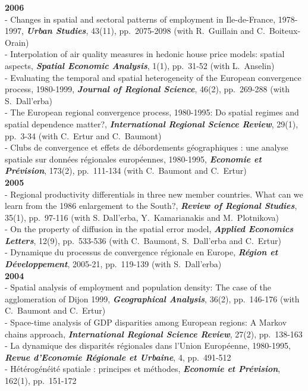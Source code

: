 \documentclass[a4paper,12pt]{article}
\begin{document}
\noindent \textbf{2006}  \smallskip \\ 
- Changes in spatial and sectoral patterns of employment in Ile-de-France, 1978-1997, \textit{\textbf{Urban Studies}}, 43(11), pp.~2075-2098 (with R.~Guillain and C.~Boiteux-Orain) \\
- Interpolation of air quality measures in hedonic house price models: spatial aspects, \textit{\textbf{Spatial Economic Analysis}}, 1(1), pp.~31-52 (with L.~Anselin) \\
- Evaluating the temporal and spatial heterogeneity of the European convergence process, 1980-1999, \textit{\textbf{Journal of Regional Science}}, 46(2), pp.~269-288 (with S.~Dall'erba) \\
- The European regional convergence process, 1980-1995: Do spatial regimes and spatial dependence matter?, \textit{\textbf{International Regional Science Review}}, 29(1), pp.~3-34 (with C.~Ertur and C.~Baumont) \\
- Clubs de convergence et effets de débordements géographiques : une analyse spatiale sur données régionales européennes, 1980-1995, \textit{\textbf{Economie et Prévision}}, 173(2), pp.~111-134 (with C.~Baumont and C.~Ertur) \\

\noindent \textbf{2005}  \smallskip \\ 
- Regional productivity differentials in three new member countries. What can we learn from the 1986 enlargement to the South?, \textit{\textbf{Review of Regional Studies}}, 35(1), pp.~97-116 (with S. Dall'erba, Y.~Kamarianakis and M.~Plotnikova) \\
- On the property of diffusion in the spatial error model, \textit{\textbf{Applied Economics Letters}}, 12(9), pp.~533-536 (with C.~Baumont, S.~Dall'erba and C.~Ertur) \\
- Dynamique du processus de convergence régionale en Europe, \textit{\textbf{Région et Développement}}, 2005-21, pp.~119-139 (with S.~Dall'erba) \\

\noindent \textbf{2004}  \smallskip \\ 
- Spatial analysis of employment and population density: The case of the agglomeration of Dijon 1999, \textit{\textbf{Geographical Analysis}}, 36(2), pp.~146-176 (with C.~Baumont and C.~Ertur) \\
- Space-time analysis of GDP disparities among European regions: A Markov chains approach, \textit{\textbf{International Regional Science Review}}, 27(2), pp.~138-163 \\
- La dynamique des disparités régionales dans l'Union Européenne, 1980-1995, \textit{\textbf{Revue d'Economie Régionale et Urbaine}}, 4, pp.~491-512 \\
- Hétérogénéité spatiale : principes et méthodes, \textit{\textbf{Economie et Prévision}}, 162(1), pp.~151-172 \\
\end{document}
